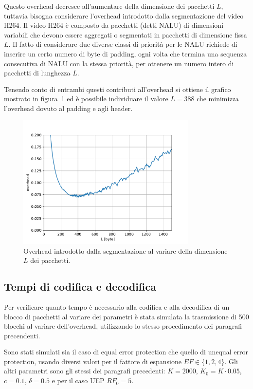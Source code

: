 \documentclass[italian, a4paper, 12pt]{article}
\begin{document}
Questo overhead decresce all'aumentare della dimensione dei pacchetti
$L$, tuttavia bisogna considerare l'overhead introdotto dalla
segmentazione del video H264.
%
Il video H264 è composto da pacchetti (detti NALU) di dimensioni
variabili che devono essere aggregati o segmentati in pacchetti di
dimensione fissa $L$. Il fatto di considerare due diverse classi di
priorità per le NALU richiede di inserire un certo numero di byte di
padding, ogni volta che termina una sequenza consecutiva di NALU con
la stessa priorità, per ottenere un numero intero di pacchetti di
lunghezza $L$.

Tenendo conto di entrambi questi contributi all'overhead si ottiene il
grafico mostrato in figura~\ref{fig:pktsize} ed è possibile
individuare il valore $L = 388$ che minimizza l'overhead dovuto al
padding e agli header.
\begin{figure}[H]
  \centering
  \includegraphics[width=0.8\textwidth]{plot_overhead}
  \caption{Overhead introdotto dalla segmentazione al variare della
    dimensione $L$ dei pacchetti.}
  \label{fig:pktsize}
\end{figure}

\subsection{Tempi di codifica e decodifica}
Per verificare quanto tempo è necessario alla codifica e alla
decodifica di un blocco di pacchetti al variare dei parametri è stata
simulata la trasmissione di 500 blocchi al variare dell'overhead,
utilizzando lo stesso procedimento dei paragrafi precendenti.

Sono stati simulati sia il caso di equal error protection che quello
di unequal error protection, usando diversi valori per il fattore di
espansione $EF \in \{ 1,2,4 \}$. Gli altri parametri sono gli stessi
dei paragrafi precedenti: $K = 2000$, $K_0 = K \cdot 0.05$, $c=0.1$,
$\delta=0.5$ e per il caso UEP $RF_0 = 5$.
\end{document}
